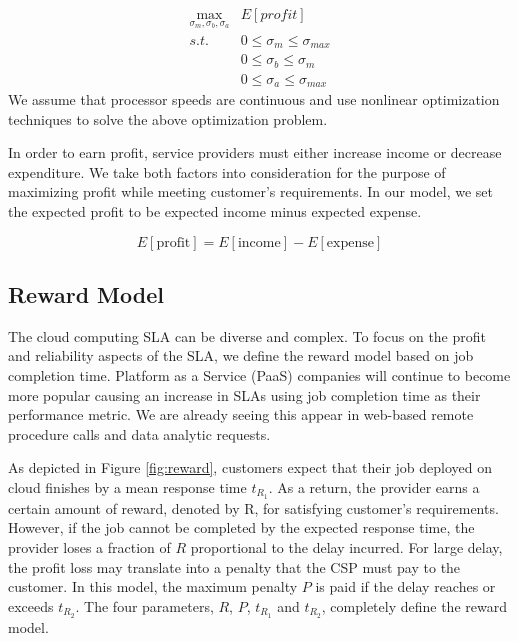 \begin{equation}
\label{optimization_problem}
\begin{alignedat}{2}
\max_{\sigma_m,\sigma_b,\sigma_a}     & E[profit] \\
s.t.                                 & 0 \leq \sigma_m \leq \sigma_{max} \\
                                     & 0 \leq \sigma_b \leq \sigma_{m} \\
                                     & 0 \leq \sigma_a \leq \sigma_{max} 
\end{alignedat}
\end{equation}
We assume that processor
speeds are continuous and use nonlinear optimization techniques
to solve the above optimization problem. 

In order to earn profit, service providers must either increase
income or decrease expenditure. We take both factors into
consideration for the purpose of maximizing profit while meeting
customer's requirements. In our model, we set the expected profit to be
expected income minus expected expense.

\begin{equation}
E[\text{profit}]=E[\text{income}]-E[\text{expense}]
\end{equation}

\subsection{Reward Model}
\label{sla_reward_model}
The cloud computing SLA can be diverse and
complex. To focus on the profit and reliability
aspects of the SLA, we define the reward model based on job completion
time. Platform as a Service (PaaS) companies will continue to become
more popular causing an increase in SLAs using job completion time as
their performance metric. We are already seeing this appear in
web-based remote procedure calls and data analytic requests.

As depicted in Figure \ref{fig:reward}, customers expect that their
job deployed on cloud finishes by a mean response time $t_{R_1}$.  As a
return, the provider earns a certain amount of reward, denoted by R,
for satisfying customer's requirements. However, if the job cannot be
completed by the expected response time, the provider loses a fraction of $R$
proportional to the delay incurred. For large delay, the profit loss may translate into a penalty that the CSP must pay to the customer. In this model, the maximum penalty $P$ is paid if the
delay reaches or exceeds $t_{R_2}$. The four
parameters, $R$, $P$, $t_{R_1}$ and
$t_{R_2}$, completely define the reward model.

